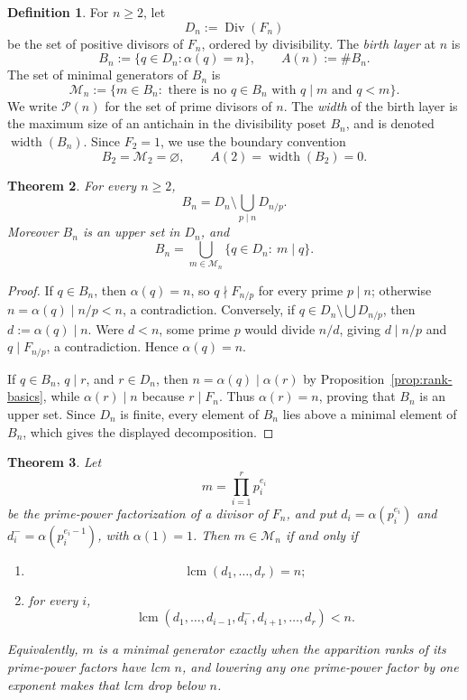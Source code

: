 \documentclass[11pt,letterpaper]{article}
\numberwithin{equation}{section}
\theoremstyle{plain}
\newtheorem{theorem}{Theorem}[section]
\theoremstyle{definition}
\newtheorem{definition}[theorem]{Definition}
\theoremstyle{remark}
\DeclareMathOperator{\lcmop}{lcm}
\DeclareMathOperator{\widthop}{width}
\begin{document}
\begin{definition}\label{def:birth-layer}
For \(n\ge2\), let
\[
D_n:=\operatorname{Div}(F_n)
\]
be the set of positive divisors of \(F_n\), ordered by divisibility. The
\emph{birth layer} at \(n\) is
\[
B_n:=\{q\in D_n:\alpha(q)=n\},
\qquad
A(n):=\#B_n.
\]
The set of minimal generators of \(B_n\) is
\[
\mathcal M_n:=
\{m\in B_n:\text{ there is no }q\in B_n\text{ with }q\mid m\text{ and }q<m\}.
\]
We write \(\mathcal P(n)\) for the set of prime divisors of \(n\). The
\emph{width} of the birth layer is the maximum size of an antichain in the
divisibility poset \(B_n\), and is denoted \(\widthop(B_n)\). Since
\(F_2=1\), we use the boundary convention
\[
B_2=\mathcal M_2=\varnothing,\qquad A(2)=\widthop(B_2)=0.
\]
\end{definition}

\begin{theorem}\label{thm:upper-fiber}
For every $n\ge 2$,
\[
B_n=D_n\setminus\bigcup_{p\mid n}D_{n/p}.
\]
Moreover $B_n$ is an upper set in $D_n$, and
\[
B_n=\bigcup_{m\in\mathcal M_n}\{q\in D_n:\ m\mid q\}.
\]
\end{theorem}

\begin{proof}
If $q\in B_n$, then $\alpha(q)=n$, so $q\nmid F_{n/p}$ for every prime
$p\mid n$; otherwise $n=\alpha(q)\mid n/p<n$, a contradiction. Conversely, if
$q\in D_n\setminus\bigcup D_{n/p}$, then $d:=\alpha(q)\mid n$. Were $d<n$,
some prime $p$ would divide $n/d$, giving $d\mid n/p$ and $q\mid F_{n/p}$, a
contradiction. Hence $\alpha(q)=n$.

If $q\in B_n$, $q\mid r$, and $r\in D_n$, then $n=\alpha(q)\mid\alpha(r)$ by
Proposition~\ref{prop:rank-basics}, while $\alpha(r)\mid n$ because
$r\mid F_n$. Thus $\alpha(r)=n$, proving that $B_n$ is an upper set. Since
$D_n$ is finite, every element of $B_n$ lies above a minimal element of
$B_n$, which gives the displayed decomposition.
\end{proof}

\begin{theorem}\label{thm:minimal-generators}
Let
\[
m=\prod_{i=1}^r p_i^{e_i}
\]
be the prime-power factorization of a divisor of \(F_n\), and put
\(d_i=\alpha(p_i^{e_i})\) and \(d_i^- =\alpha(p_i^{e_i-1})\), with
\(\alpha(1)=1\). Then \(m\in\mathcal M_n\) if and only if
\begin{enumerate}[label=\textup{(\roman*)}]
\item
\[
\lcmop(d_1,\ldots,d_r)=n;
\]
\item for every \(i\),
\[
\lcmop(d_1,\ldots,d_{i-1},d_i^-,d_{i+1},\ldots,d_r)<n.
\]
\end{enumerate}
Equivalently, \(m\) is a minimal generator exactly when the apparition ranks of
its prime-power factors have lcm \(n\), and lowering any one prime-power factor
by one exponent makes that lcm drop below \(n\).
\end{theorem}
\end{document}
